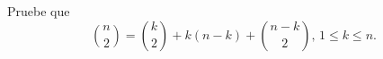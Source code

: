 \begin{statement}{3}
  Pruebe que
  \[
    \binom{n}{2} = \binom{k}{2} + k (n - k) + \binom{n - k}{2},\, 1 \leq k \leq n.  
  \]
\end{statement}
